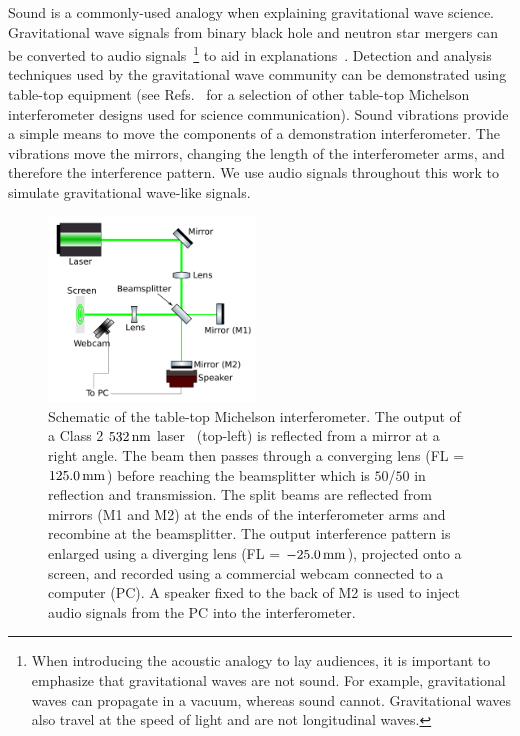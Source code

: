 \documentclass[paper-main.tex]{subfiles}
\begin{document}
Sound is a commonly-used analogy when explaining gravitational wave science. 
Gravitational wave signals from binary black hole and neutron star mergers can be converted to audio signals~\footnote{When introducing the acoustic analogy to lay audiences, it is important to emphasize that gravitational waves are not sound. For example, gravitational waves can propagate in a vacuum, whereas sound cannot. Gravitational waves also travel at the speed of light and are not longitudinal waves.} to aid in explanations~\cite{SoundsOfSpaceTime:online,BlackHoleHunter:online}.
Detection and analysis techniques used by the gravitational wave community can be demonstrated using table-top equipment (see Refs.~\cite{TTExhibit:2020,TTExhibit:online,AMIGO:online,ThorLabsIFO,LIGOIFOGlue,LIGOIFOMagnets,FoxEtAl:1999} for a selection of other table-top Michelson interferometer designs used for science communication).
Sound vibrations provide a simple means to move the components of a demonstration interferometer. 
The vibrations move the mirrors, changing the length of the interferometer arms, and therefore the interference pattern.
We use audio signals throughout this work to simulate gravitational wave-like signals.


\begin{figure}
	\includegraphics[width=0.49\textwidth]{figures/ifo_schematic_webcam_edit.pdf}
	\caption{\label{fig:ifo_schematic_webcam}
Schematic of the table-top Michelson interferometer. 
The output of a Class 2 $532\,{\rm nm}$ laser~\cite{ThorLabsIFO} (top-left) is reflected from a mirror at a right angle. The beam then passes through a converging lens (FL = $125.0\,{\rm mm}$) before reaching the beamsplitter which is $50$/$50$ in reflection and transmission. 
The split beams are reflected from mirrors (M1 and M2) at the ends of the interferometer arms and recombine at the beamsplitter. 
The output interference pattern is enlarged using a diverging lens (FL = $-25.0\,{\rm mm}$), projected onto a screen, and recorded using a commercial webcam connected to a computer (PC). 
A speaker fixed to the back of M2 is used to inject audio signals from the PC into the interferometer.
    }
\end{figure}
\end{document}
